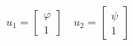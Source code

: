 \documentclass[preview]{standalone}
\begin{document}
\begin{align*}
u_1 = \begin{bmatrix} \varphi \\ 1 \end{bmatrix} \quad u_2 = \begin{bmatrix} \psi \\ 1 \end{bmatrix}
\end{align*}
\end{document}
